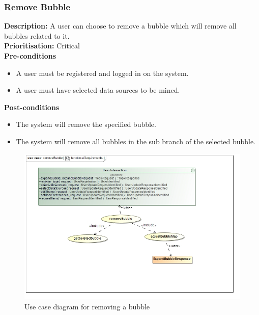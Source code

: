 \documentclass[hidelinks,english]{article}
\begin{document}
    		\subsubsection{Remove Bubble}
				\textbf{Description:}  A user can choose to remove a bubble which will remove all bubbles related to it.\\
			    \textbf{Prioritisation:} Critical\\
     			\textbf{Pre-conditions}
				\begin{itemize}
					\item A user must be registered and logged in on the system.
					\item A user must have selected data sources to be mined.
				\end{itemize}
    			\textbf{Post-conditions}
     			\begin{itemize}
			        \item The system will remove the specified bubble.
			        \item The system will remove all bubbles in the sub branch of the selected bubble.
    			\end{itemize}
    			
    			\begin{figure}[!h]
    			\includegraphics[width=\linewidth]{removeBubbleFunctionalRequirements.jpg}
    			\caption{Use case diagram for removing a bubble}
    			\label{UseCaseRmoveBubble}
    			\end{figure}
    			
    		
    		
    		
\end{document}
